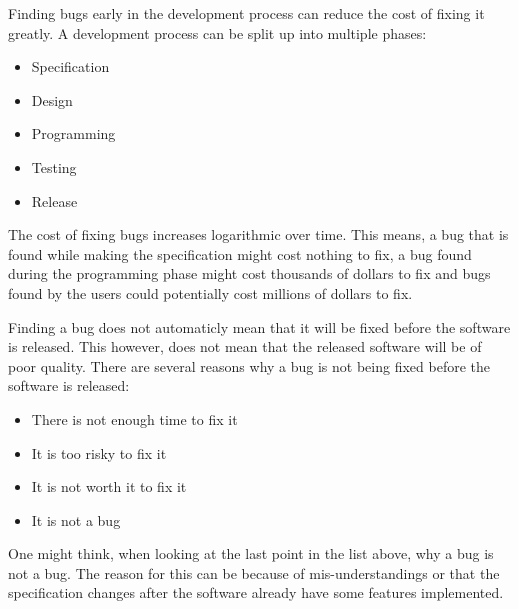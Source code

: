 Finding bugs early in the development process can reduce the cost of fixing it greatly.
A development process can be split up into multiple phases:

\begin{itemize}
	\item Specification
	\item Design
	\item Programming
	\item Testing
	\item Release
\end{itemize}

The cost of fixing bugs increases logarithmic over time.
This means, a bug that is found while making the specification might cost nothing to fix, a bug found during the programming phase might cost thousands of dollars to fix and bugs found by the users could potentially cost millions of dollars to fix. \cite{SoftwareTesting}


Finding a bug does not automaticly mean that it will be fixed before the software is released.
This however, does not mean that the released software will be of poor quality.
There are several reasons why a bug is not being fixed before the software is released: \cite{SoftwareTesting}

\begin{itemize}
	\item There is not enough time to fix it
	\item It is too risky to fix it
	\item It is not worth it to fix it
	\item It is not a bug
\end{itemize}

One might think, when looking at the last point in the list above, why a bug is not a bug.
The reason for this can be because of mis-understandings or that the specification changes after the software already have some features implemented. \cite{SoftwareTesting}

